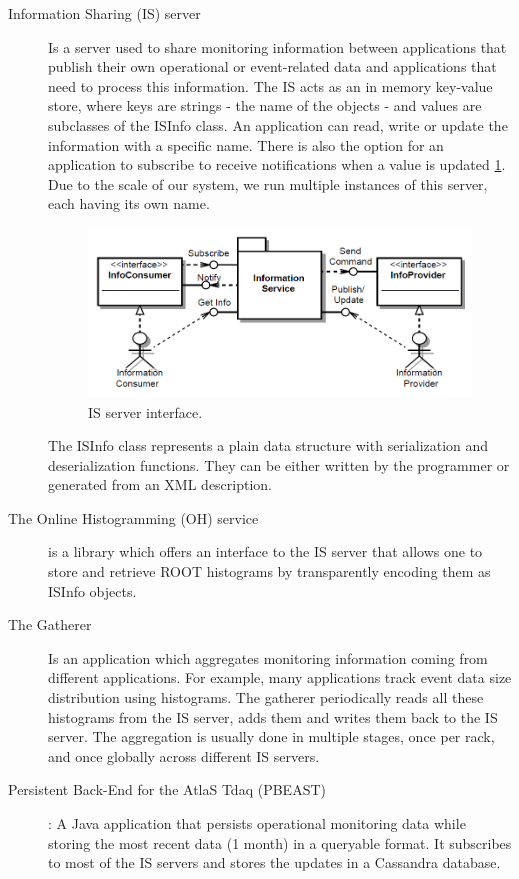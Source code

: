 \begin{description}
\item[Information Sharing (IS) server \citep{kolosinformation}]  Is a server used to share monitoring information between applications that publish their own operational or event-related data and applications that need to process this information. The IS acts as an in memory key-value store, where keys are strings - the name of the objects - and values are subclasses of the ISInfo class. An application can read, write or update the information with a specific name. There is also the option for an application to subscribe to receive notifications when a value is updated \ref{fig:IS_overview}. Due to the scale of our system, we run multiple instances of this server, each having its own name.

\begin{figure}[ht!]
\centering
\includegraphics[scale=0.44]{Images/IS.png}
\caption{IS server interface.}
\label{fig:IS_overview}
\end{figure}


The ISInfo class represents a plain data structure with serialization and deserialization functions. They can be either written by the programmer or generated from an XML description.

\item[The Online Histogramming (OH) service \citep{kolosoh}] is a library which offers an interface to the IS server that allows one to store and retrieve ROOT histograms by transparently encoding them as ISInfo objects.

\item[The Gatherer \citep{renkel2010gatherer}] Is an application which aggregates monitoring information coming from different applications. For example, many applications track event data size distribution using histograms. The gatherer periodically reads all these histograms from the IS server, adds them and writes them back to the IS server. The aggregation is usually done in multiple stages, once per rack, and once globally across different IS servers. 

\item[Persistent Back-End for the AtlaS Tdaq (PBEAST) \citep{sicoe2012persistent}]: A Java application that persists operational monitoring data while storing the most recent data (1 month) in a queryable format. It subscribes to most of the IS servers and stores the updates in a Cassandra database.

\end{description}

